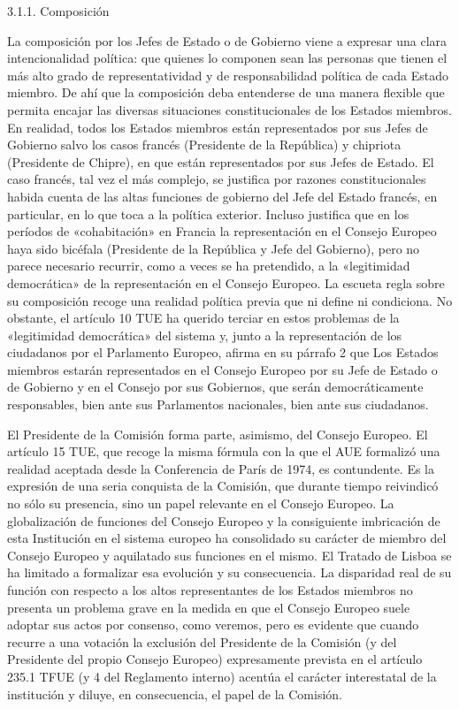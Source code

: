 \documentclass[10pt,a4paper]{article}
\begin{document}
3.1.1. Composición

La composición por los Jefes de Estado o de Gobierno viene a expresar una clara intencionalidad política: que quienes lo componen sean las personas que tienen el más alto grado de representatividad y de responsabilidad política de cada Estado miembro. De ahí que la composición deba entenderse de una manera flexible que permita encajar las diversas situaciones constitucionales de los Estados miembros. En realidad, todos los Estados miembros están representados por sus Jefes de Gobierno salvo los casos francés (Presidente de la República) y chipriota (Presidente de Chipre), en que están representados por sus Jefes de Estado. El caso francés, tal vez el más complejo, se justifica por razones constitucionales habida cuenta de las altas funciones de gobierno del Jefe del Estado francés, en particular, en lo que toca a la política exterior. Incluso justifica que en los períodos de «cohabitación» en Francia la representación en el Consejo Europeo haya sido bicéfala (Presidente de la República y Jefe del Gobierno), pero no parece necesario recurrir, como a veces se ha pretendido, a la «legitimidad democrática» de la representación en el Consejo Europeo. La escueta regla sobre su composición recoge una realidad política previa que ni define ni condiciona. No obstante, el artículo 10 TUE ha querido terciar en estos problemas de la «legitimidad democrática» del sistema y, junto a la representación de los ciudadanos por el Parlamento Europeo, afirma en su párrafo 2 que Los Estados miembros estarán representados en el Consejo Europeo por su Jefe de Estado o de Gobierno y en el Consejo por sus Gobiernos, que serán democráticamente responsables, bien ante sus Parlamentos nacionales, bien ante sus ciudadanos.

El Presidente de la Comisión forma parte, asimismo, del Consejo Europeo. El artículo 15 TUE, que recoge la misma fórmula con la que el AUE formalizó una realidad aceptada desde la Conferencia de París de 1974, es contundente. Es la expresión de una seria conquista de la Comisión, que durante tiempo reivindicó no sólo su presencia, sino un papel relevante en el Consejo Europeo. La globalización de funciones del Consejo Europeo y la consiguiente imbricación de esta Institución en el sistema europeo ha consolidado su carácter de miembro del Consejo Europeo y aquilatado sus funciones en el mismo. El Tratado de Lisboa se ha limitado a formalizar esa evolución y su consecuencia. La disparidad real de su función con respecto a los altos representantes de los Estados miembros no presenta un problema grave en la medida en que el Consejo Europeo suele adoptar sus actos por consenso, como veremos, pero es evidente que cuando recurre a una votación la exclusión del Presidente de la Comisión (y del Presidente del propio Consejo Europeo) expresamente prevista en el artículo 235.1 TFUE (y 4 del Reglamento interno) acentúa el carácter interestatal de la institución y diluye, en consecuencia, el papel de la Comisión. 
\end{document}
